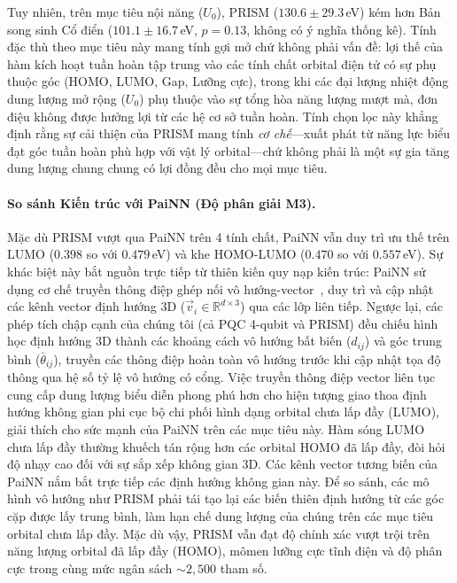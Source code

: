 \documentclass[10pt,twocolumn,letterpaper]{article}
\begin{document}
Tuy nhiên, trên mục tiêu nội năng ($U_0$), PRISM ($130.6 \pm 29.3$\,eV) kém hơn Bản song sinh Cổ điển ($101.1 \pm 16.7$\,eV, $p = 0.13$, không có ý nghĩa thống kê). Tính đặc thù theo mục tiêu này mang tính gợi mở chứ không phải vấn đề: lợi thế của hàm kích hoạt tuần hoàn tập trung vào các tính chất orbital điện tử có sự phụ thuộc góc (HOMO, LUMO, Gap, Lưỡng cực), trong khi các đại lượng nhiệt động dung lượng mở rộng ($U_0$) phụ thuộc vào sự tổng hòa năng lượng mượt mà, đơn điệu không được hưởng lợi từ các hệ cơ sở tuần hoàn. Tính chọn lọc này khẳng định rằng sự cải thiện của PRISM mang tính \textit{cơ chế}---xuất phát từ năng lực biểu đạt góc tuần hoàn phù hợp với vật lý orbital---chứ không phải là một sự gia tăng dung lượng chung chung có lợi đồng đều cho mọi mục tiêu.

\paragraph{So sánh Kiến trúc với PaiNN (Độ phân giải M3).}
Mặc dù PRISM vượt qua PaiNN trên 4 tính chất, PaiNN vẫn duy trì ưu thế trên LUMO ($0.398$ so với $0.479$\,eV) và khe HOMO-LUMO ($0.470$ so với $0.557$\,eV).
Sự khác biệt này bắt nguồn trực tiếp từ thiên kiến quy nạp kiến trúc: PaiNN sử dụng cơ chế truyền thông điệp ghép nối vô hướng-vector~\cite{schuttEquivariantMessagePassing2021}, duy trì và cập nhật các kênh vector định hướng 3D ($\vec{v}_i \in \mathbb{R}^{d \times 3}$) qua các lớp liên tiếp.
Ngược lại, các phép tích chập cạnh của chúng tôi (cả PQC 4-qubit và PRISM) đều chiếu hình học định hướng 3D thành các khoảng cách vô hướng bất biến ($d_{ij}$) và góc trung bình ($\bar{\theta}_{ij}$), truyền các thông điệp hoàn toàn vô hướng trước khi cập nhật tọa độ thông qua hệ số tỷ lệ vô hướng có cổng.
Việc truyền thông điệp vector liên tục cung cấp dung lượng biểu diễn phong phú hơn cho hiện tượng giao thoa định hướng không gian phi cục bộ chi phối hình dạng orbital chưa lấp đầy (LUMO), giải thích cho sức mạnh của PaiNN trên các mục tiêu này.
Hàm sóng LUMO chưa lấp đầy thường khuếch tán rộng hơn các orbital HOMO đã lấp đầy, đòi hỏi độ nhạy cao đối với sự sắp xếp không gian 3D. Các kênh vector tương biến của PaiNN nắm bắt trực tiếp các định hướng không gian này. Để so sánh, các mô hình vô hướng như PRISM phải tái tạo lại các biến thiên định hướng từ các góc cặp được lấy trung bình, làm hạn chế dung lượng của chúng trên các mục tiêu orbital chưa lấp đầy.
Mặc dù vậy, PRISM vẫn đạt độ chính xác vượt trội trên năng lượng orbital đã lấp đầy (HOMO), mômen lưỡng cực tĩnh điện và độ phân cực trong cùng mức ngân sách $\sim 2{,}500$ tham số.
\end{document}
